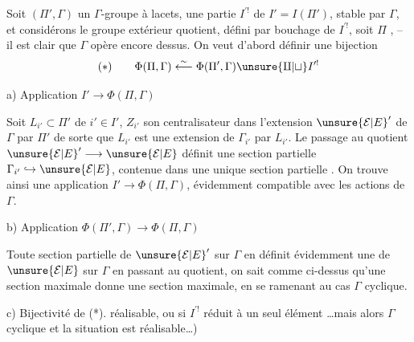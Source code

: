 Soit  $(\Pi',\Gamma)$ un $\Gamma$-groupe 
à lacets,   une partie
$I^{\prime!}$ de $I'=I(\Pi')$, stable par $\Gamma$,
et considérons le groupe extérieur quotient, défini par bouchage de $I^{\prime!}$,
soit $\Pi$ , -- il est clair que $\Gamma$ opère encore dessus.
On veut d'abord définir une bijection
\[
(*)\qquad\Phi(\Pi,\Gamma)\overset{\sim}{\longleftarrow}
\Phi(\Pi',\Gamma)\unsure{\amalg|\sqcup} I^{\prime!}
\]

a) Application $I'\longrightarrow\Phi(\Pi,\Gamma)$

Soit $L_{i'}\subset\Pi'$ de  $i'\in I'$, $Z_{i'}$ son centralisateur dans l'extension $\unsure{\mathcal E|E}'$ de $\Gamma$ par $\Pi'$
de sorte que $L_{i'}$ est une extension de $\Gamma_{i'}$
par $L_{i'}$. Le passage au quotient $\unsure{\mathcal E|E}'\longrightarrow\unsure{\mathcal E|E}$
définit une section partielle $\Gamma_{i'}\hookrightarrow\unsure{\mathcal E|E}$,
contenue dans une unique section partielle 
.
On trouve ainsi une application $I'\longrightarrow\Phi(\Pi,\Gamma)$,
évidemment compatible avec les actions de $\Gamma$.

b) Application $\Phi(\Pi',\Gamma)\longrightarrow\Phi(\Pi,\Gamma)$

Toute section partielle  de $\unsure{\mathcal E|E}'$ sur $\Gamma$ en définit
évidemment une de $\unsure{\mathcal E|E}$ sur $\Gamma$ en passant au
quotient, on sait comme ci-dessus qu'une
section maximale donne une section maximale,
en se ramenant au cas $\Gamma$ cyclique.

c) Bijectivité de (*).  
réalisable, ou si $I^{\prime!}$ réduit à un seul élément
\ldots mais alors $\Gamma$ cyclique et la situation est réalisable\ldots)

